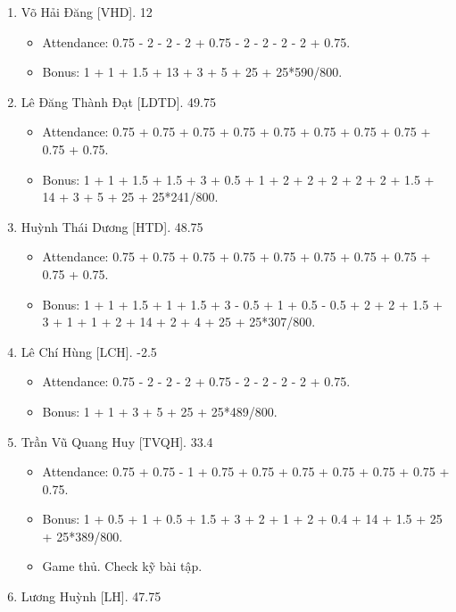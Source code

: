 \documentclass{article}
\begin{document}
\begin{enumerate}
\begin{itemize}
        \item Bonus: 1 + 1 - 0.5 + 0.5 + 1.5 + 3 + 1 + 2 + 2 + 2 + 3 + 8 + 25 + 25*506/800.
    \end{itemize}
    \item {\sc Võ Hải Đăng [VHD].} 12
    \begin{itemize}
        \item Attendance: 0.75 - 2 - 2 - 2 + 0.75 - 2 - 2 - 2 - 2 + 0.75.
        \item Bonus: 1 + 1 + 1.5 + 13 + 3 + 5 + 25 + 25*590/800.
    \end{itemize}
    \item {\sc Lê Đăng Thành Đạt [LDTD].} 49.75
    \begin{itemize}
        \item Attendance: 0.75 + 0.75 + 0.75 + 0.75 + 0.75 + 0.75 + 0.75 + 0.75 + 0.75 + 0.75.
        \item Bonus: 1 + 1 + 1.5 + 1.5 + 3 + 0.5 + 1 + 2 + 2 + 2 + 2 + 2 + 1.5 + 14 + 3 + 5 + 25 + 25*241/800.
    \end{itemize}
    \item {\sc Huỳnh Thái Dương [HTD].} 48.75
    \begin{itemize}
        \item Attendance: 0.75 + 0.75 + 0.75 + 0.75 + 0.75 + 0.75 + 0.75 + 0.75 + 0.75 + 0.75.
        \item Bonus: 1 + 1 + 1.5 + 1 + 1.5 + 3 - 0.5 + 1 + 0.5 - 0.5 + 2 + 2 + 1.5 + 3 + 1 + 1 + 2 + 14 + 2 + 4 + 25 + 25*307/800.
    \end{itemize}
    \item {\sc Lê Chí Hùng [LCH].} -2.5
    \begin{itemize}
        \item Attendance: 0.75 - 2 - 2 - 2 + 0.75 - 2 - 2 - 2 - 2 + 0.75.
        \item Bonus: 1 + 1 + 3 + 5 + 25 + 25*489/800.
    \end{itemize}
    \item {\sc Trần Vũ Quang Huy [TVQH].} 33.4
    \begin{itemize}
        \item Attendance: 0.75 + 0.75 - 1 + 0.75 + 0.75 + 0.75 + 0.75 + 0.75 + 0.75 + 0.75.
        \item Bonus: 1 + 0.5 + 1 + 0.5 + 1.5 + 3 + 2 + 1 + 2 + 0.4 + 14 + 1.5 + 25 + 25*389/800.
        \item Game thủ. Check kỹ bài tập.
    \end{itemize}
    \item {\sc Lương Huỳnh [LH].} 47.75

\end{enumerate}
\end{document}
